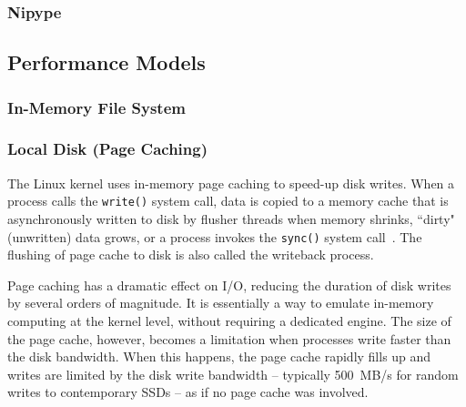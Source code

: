 \documentclass{IEEEtran}
\begin{document}
\subsubsection{Nipype}


\subsection{Performance Models}

\subsubsection{In-Memory File System}

\subsubsection{Local Disk (Page Caching)} %




The Linux kernel uses in-memory page caching to speed-up disk writes. 
When a process calls the \texttt{write()} system call, data is copied 
to a memory cache that is asynchronously written to disk by flusher 
threads when memory shrinks, ``dirty" (unwritten) data grows, or a 
process invokes the \texttt{sync()} system call~\cite{love2010linux}. 
The flushing of page cache to disk is also called the writeback 
process.

Page caching has a dramatic effect on I/O, reducing the duration of 
disk writes by several orders of magnitude. It is essentially a way to 
emulate in-memory computing at the kernel level, without requiring a 
dedicated engine. The size of the page cache, however, becomes a 
limitation when processes write faster than the disk bandwidth. When 
this happens, the page cache rapidly fills up and writes are limited by 
the disk write bandwidth -- typically 500~MB/s for random writes to 
contemporary SSDs  -- as if no page cache was involved.
\end{document}
